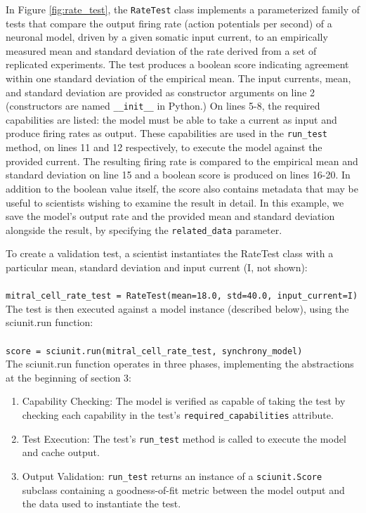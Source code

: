 \documentclass[a4paper,12pt]{article}
\begin{document}
In Figure \ref{fig:rate_test}, the \verb|RateTest| class implements a parameterized family of tests that compare the output firing rate (action potentials per second) of a neuronal model, driven by a given somatic input current, to an empirically measured mean and standard deviation of the rate derived from a set of replicated experiments. The test produces a boolean score indicating agreement within one standard deviation of the empirical mean. The input currents, mean, and standard deviation are provided as constructor arguments on line 2 (constructors are named \verb|__init__| in Python.) On lines 5-8, the required capabilities are listed: the model must be able to take a current as input and produce firing rates as output. These capabilities are used in the \verb|run_test| method, on lines 11 and 12 respectively, to execute the model against the provided current. The resulting firing rate is compared to the empirical mean and standard deviation on line 15 and a boolean score is produced on lines 16-20. In addition to the boolean value itself, the score also contains metadata that may be useful to scientists wishing to examine the result in detail. In this example, we save the model's output rate and the provided mean and standard deviation alongside the result, by specifying the \verb|related_data| parameter.

To create a validation test, a scientist instantiates the RateTest class with a particular mean, standard deviation and input current (I, not shown):
\\
\\
\verb|mitral_cell_rate_test = RateTest(mean=18.0, std=40.0, input_current=I)|
\\

The test is then executed against a model instance (described below), using the sciunit.run function:
\\
\\
\verb|score = sciunit.run(mitral_cell_rate_test, synchrony_model)|
\\

The sciunit.run function operates in three phases, implementing the abstractions at the beginning of section 3:
\begin{enumerate}
\item Capability Checking: The model is verified as capable of taking the test by checking each capability in the test's \verb|required_capabilities| attribute.
\item Test Execution: The test's \verb|run_test| method is called to execute the model and cache output.
\item Output Validation: \verb|run_test| returns an instance of a \verb|sciunit.Score| subclass containing a goodness-of-fit metric between the model output and the data used to instantiate the test.
\end{enumerate}
\end{document}
